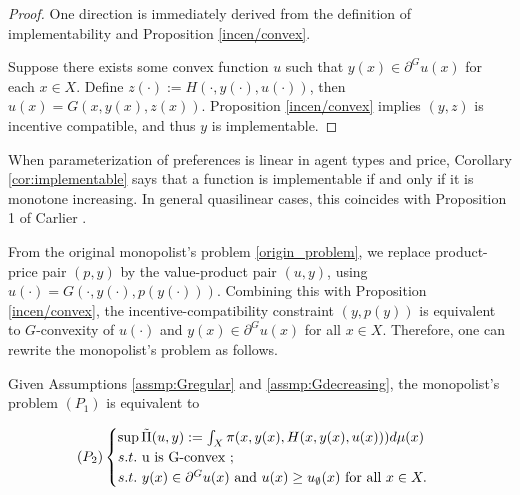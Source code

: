 {\begin{proof}%
	One direction is immediately derived from the definition of implementability and Proposition \ref{incen/convex}.
	
	Suppose there exists some convex function $u$ such that $y(x) \in \partial^G u(x)$ for each $x \in X$. Define $z(\cdot):= H(\cdot, y(\cdot), u(\cdot))$, then $u(x) = G(x, y(x), z(x))$.
	Proposition \ref{incen/convex} implies $(y, z)$ is incentive compatible, and thus $y$ is implementable.
\end{proof}
}

When parameterization of preferences is linear in agent types and price, Corollary \ref{cor:implementable} says that a function is implementable if and only if it is monotone increasing. In general quasilinear cases, this coincides with Proposition 1 of Carlier \cite{Carlier01}. \medskip


From the original monopolist's problem \eqref{origin_problem}, we replace product-price pair $(p,y)$ by the value-product pair $(u,y)$, using $u(\cdot) = G(\cdot, y(\cdot), p(y(\cdot)))$. %
Combining this with Proposition \ref{incen/convex}, the incentive-compatibility constraint $(y,p(y))$ is equivalent to $G$-convexity of $u(\cdot)$ and $y(x) \in \partial^G u(x)$ for all $x\in X$. Therefore, one can rewrite the monopolist's problem as follows.

\begin{proposition}\label{equiv_form}
	
	Given Assumptions \ref{assmp:Gregular} and \ref{assmp:Gdecreasing}, the monopolist's problem $(P_1)$ is equivalent to
	
	\begin{equation}\label{Principal_new_problem}
	(P_2)
	\begin{cases}
	\sup \tilde{\Pi}(u,y):=\int_{X} \pi(x, y(x), H(x,y(x), u(x))) d\mu(x)\\
	s.t.\ $u$ \text{ is } $G$\text{-convex };\\
	s.t.\ y(x) \in \partial^G u(x) \text{ and }u(x)\ge u_{\emptyset}(x) \text{ for all } x \in X.
	\end{cases}
	\end{equation}
\end{proposition}


